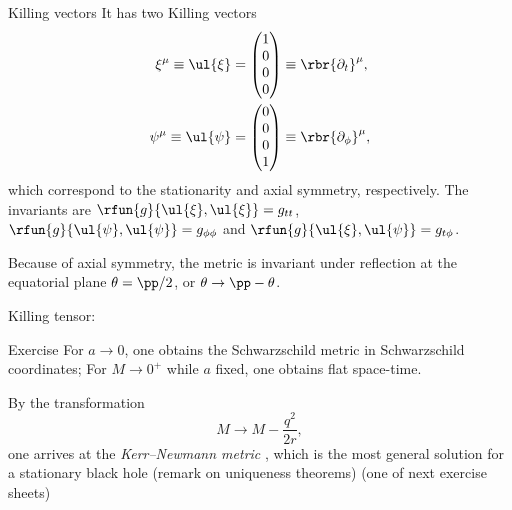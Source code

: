 \begin{nameddef}{Killing vectors}
It has two Killing vectors
\begin{align}
\xi^\mu \equiv \ul{\xi} &= \begin{pmatrix} 1 \\ 0 \\ 0 \\ 0 \end{pmatrix}
\equiv \rbr{\partial_t}^\mu,
\label{eq:Kerr-killing-1} \\
\psi^\mu \equiv \ul{\psi} &= \begin{pmatrix} 0 \\ 0 \\ 0 \\ 1 \end{pmatrix}
\equiv \rbr{\partial_\phi}^\mu,
\label{eq:Kerr-killing-2}
\end{align}
which correspond to the stationarity and axial symmetry, respectively. The
invariants are $\rfun{g}{\ul{\xi}, \ul{\xi}} = g_{tt}$, $\rfun{g}{\ul{\psi},
\ul{\psi}} = g_{\phi\phi}$ and $\rfun{g}{\ul{\xi}, \ul{\psi}} = g_{t\phi}$.

Because of axial symmetry, the metric is invariant under reflection at the
equatorial plane $\theta = \pp/2$, or $\theta \to \pp - \theta$.

Killing tensor: \cite{PhysRev.174.1559}
\end{nameddef} %

\begin{nameddef}{Exercise}
For $a \to 0$, one obtains the Schwarzschild metric in Schwarzschild
coordinates; For $M \to 0^+$ while $a$ fixed, one obtains flat
space-time.
\end{nameddef} %

\begin{unamedrem}
By the transformation
\begin{equation}
M \to M-\frac{q^2}{2r},
\end{equation}
one arrives at the \emph{Kerr--Newmann metric}
\cite{:/content/aip/journal/jmp/6/6/10.1063/1.1704350}, which is the most
general solution for a stationary black hole (remark on uniqueness theorems)
(one of next exercise sheets)
\end{unamedrem}

